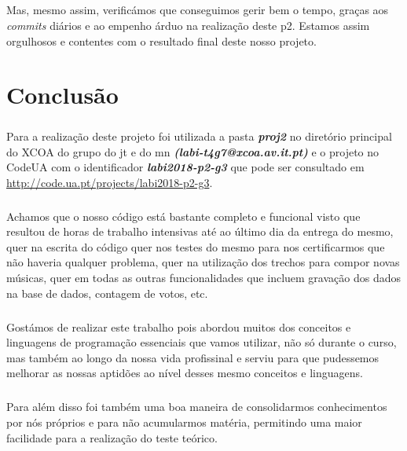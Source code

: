 \documentclass[a4paper]{report}
\begin{document}
\paragraph{}Mas, mesmo assim, verificámos que conseguimos gerir bem o tempo, graças aos \textit{commits} diários e ao empenho árduo na realização deste \ac{p2}. Estamos assim orgulhosos e contentes com o resultado final deste nosso projeto.

\newpage

\chapter{Conclusão}
\label{chap.conclusao}

\paragraph{}Para a realização deste projeto foi utilizada a pasta \textit{\textbf{proj2}} no diretório principal do XCOA do grupo do \ac{jt} e do \ac{mn} \textit{\textbf{(labi-t4g7@xcoa.av.it.pt)}} e o projeto no CodeUA com o identificador \textit{\textbf{labi2018-p2-g3}} que pode ser consultado em \url{http://code.ua.pt/projects/labi2018-p2-g3}.

\paragraph{}Achamos que o nosso código está bastante completo e funcional visto que resultou de horas de trabalho intensivas até ao último dia da entrega do mesmo, quer na escrita do código quer nos testes do mesmo para nos certificarmos que não haveria qualquer problema, quer na utilização dos trechos para compor novas músicas, quer em todas as outras funcionalidades que incluem gravação dos dados na base de dados, contagem de votos, etc.

\paragraph{}Gostámos de realizar este trabalho pois abordou muitos dos conceitos e linguagens de programação essenciais que vamos utilizar, não só durante o curso, mas também ao longo da nossa vida profissinal e serviu para que pudessemos melhorar as nossas aptidões ao nível desses mesmo conceitos e linguagens.

\paragraph{}Para além disso foi também uma boa maneira de consolidarmos conhecimentos por nós próprios e para não acumularmos matéria, permitindo uma maior facilidade para a realização do teste teórico.
\end{document}
